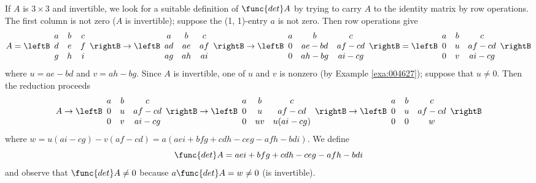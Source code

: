 If $A$ is $3 \times 3$ and invertible, we look for a suitable definition of $\func{det } A$ by trying to carry $A$ to the identity matrix by row operations. The first column is not zero ($A$ is invertible); suppose the (1, 1)-entry $a$ is not zero. Then row operations give
\begin{equation*}
A = \leftB \begin{array}{ccc}
a & b & c \\
d & e & f \\
g & h & i 
\end{array} \rightB
\rightarrow
\leftB \begin{array}{ccc}
a & b & c \\
ad & ae & af \\
ag & ah & ai 
\end{array} \rightB
\rightarrow
\leftB \begin{array}{ccc}
a & b & c \\
0 & ae-bd & af-cd \\
0 & ah-bg & ai-cg 
\end{array} \rightB
=
\leftB \begin{array}{ccc}
a & b & c \\
0 & u & af-cd \\
0 & v & ai-cg 
\end{array} \rightB
\end{equation*}
where $u = ae - bd$ and $v = ah - bg$. Since $A$ is invertible, one of $u$ and $v$ is nonzero (by Example \ref{exa:004627}); suppose that $u \neq 0$. Then the reduction proceeds
\begin{equation*}
A \rightarrow \leftB \begin{array}{ccc}
a & b & c \\
0 & u & af-cd \\
0 & v & ai-cg 
\end{array} \rightB
\rightarrow
\leftB \begin{array}{ccc}
a & b & c \\
0 & u & af-cd \\
0 & uv & u(ai-cg) 
\end{array} \rightB
\rightarrow
\leftB \begin{array}{ccc}
a & b & c \\
0 & u & af-cd \\
0 & 0 & w 
\end{array} \rightB
\end{equation*}
where $w = u(ai - cg)- v(af - cd) = a(aei + bfg + cdh - ceg - afh - bdi)$. We define
\begin{equation}\label{eq:detdefinition}
\func{det } A = aei + bfg + cdh - ceg - afh - bdi
\end{equation}
and observe that $\func{det } A \neq 0$ because $a \func{det } A = w \neq 0$ (is invertible).


